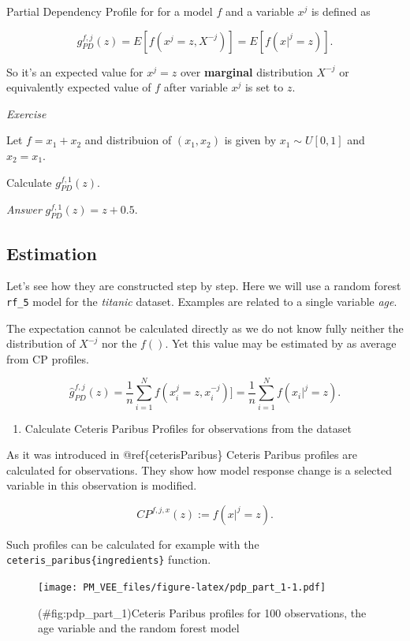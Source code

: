 \documentclass[12pt,]{krantz}
\providecommand{\tightlist}{%
  \setlength{\itemsep}{0pt}\setlength{\parskip}{0pt}}
\theoremstyle{definition}
\theoremstyle{definition}
\theoremstyle{definition}
\theoremstyle{remark}
\begin{document}
Partial Dependency Profile for for a model \(f\) and a variable \(x^j\)
is defined as

\[
g_{PD}^{f, j}(z) = E[f(x^j=z, X^{-j})] = E[f(x|^j=z)].
\]

So it's an expected value for \(x^j = z\) over \textbf{marginal}
distribution \(X^{-j}\) or equivalently expected value of \(f\) after
variable \(x^j\) is set to \(z\).

\emph{Exercise}

Let \(f = x_1 + x_2\) and distribuion of \((x_1, x_2)\) is given by
\(x_1 \sim U[0,1]\) and \(x_2=x_1\).

Calculate \(g_{PD}^{f, 1}(z)\).

\emph{Answer} \(g_{PD}^{f, 1}(z) = z + 0.5\).

\hypertarget{estimation}{%
\subsection{Estimation}\label{estimation}}

Let's see how they are constructed step by step. Here we will use a
random forest \texttt{rf\_5} model for the \emph{titanic} dataset.
Examples are related to a single variable \emph{age}.

The expectation cannot be calculated directly as we do not know fully
neither the distribution of \(X^{-j}\) nor the \(f()\). Yet this value
may be estimated by as average from CP profiles.

\[
\hat g_{PD}^{f, j}(z) = \frac 1n \sum_{i=1}^{N} f(x_i^j=z, x^{-j}_i)] = \frac 1n \sum_{i=1}^{N} f(x_i|^j=z).
\]

\begin{enumerate}
\def\labelenumi{\arabic{enumi}.}
\tightlist
\item
  Calculate Ceteris Paribus Profiles for observations from the dataset
\end{enumerate}

As it was introduced in @ref\{ceterisParibus\} Ceteris Paribus profiles
are calculated for observations. They show how model response change is
a selected variable in this observation is modified.

\[
CP^{f, j, x}(z) := f(x|^j = z).
\]

Such profiles can be calculated for example with the
\texttt{ceteris\_paribus\{ingredients\}} function.

\begin{figure}
\centering
\texttt{[image: PM\_VEE\_files/figure-latex/pdp\_part\_1-1.pdf]}
\caption{(\#fig:pdp\_part\_1)Ceteris Paribus profiles for 100
observations, the age variable and the random forest model}
\end{figure}
\end{document}
